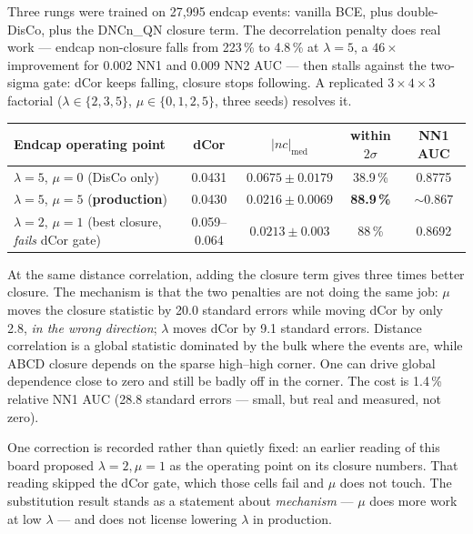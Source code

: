 \documentclass[11pt]{article}
\begin{document}

Three rungs were trained on 27{,}995 endcap events: vanilla BCE, plus
double-DisCo, plus the DNCn\_QN closure term. The decorrelation penalty does real
work --- endcap non-closure falls from 223\,\% to 4.8\,\% at $\lambda=5$, a
$46\times$ improvement for 0.002 NN1 and 0.009 NN2 AUC --- then stalls against
the two-sigma gate: dCor keeps falling, closure stops following. A replicated $3\times4\times3$ factorial ($\lambda\in\{2,3,5\}$,
$\mu\in\{0,1,2,5\}$, three seeds) resolves it.

\begin{center}\boardfont
\begin{tabular}{|l|c|c|c|c|}
\hline
\textbf{Endcap operating point} & \textbf{dCor} & \textbf{$|nc|_{\mathrm{med}}$} & \textbf{within $2\sigma$} & \textbf{NN1 AUC} \\ \hline
$\lambda=5$, $\mu=0$ (DisCo only) & 0.0431 & $0.0675\pm0.0179$ & 38.9\,\% & 0.8775 \\ \hline
$\lambda=5$, $\mu=5$ (\textbf{production}) & 0.0430 & $\mathbf{0.0216\pm0.0069}$ & \textbf{88.9\,\%} & $\sim$0.867 \\ \hline
$\lambda=2$, $\mu=1$ (best closure, \emph{fails} dCor gate) & 0.059--0.064 & $0.0213\pm0.003$ & 88\,\% & 0.8692 \\ \hline
\end{tabular}
\end{center}

At the same distance correlation, adding the closure term gives three times
better closure. The mechanism is that the two penalties are not doing the same
job: $\mu$ moves the closure statistic by 20.0 standard errors while moving
dCor by only 2.8, \emph{in the wrong direction}; $\lambda$ moves dCor by 9.1
standard errors. Distance correlation is a global statistic dominated by the
bulk where the events are, while ABCD closure depends on the sparse
high--high corner. One can drive global dependence close to zero and still be
badly off in the corner. The cost is 1.4\,\% relative NN1 AUC (28.8 standard
errors --- small, but real and measured, not zero).

One correction is recorded rather than quietly fixed: an earlier reading of this
board proposed $\lambda=2,\mu=1$ as the operating point on its closure numbers.
That reading skipped the dCor gate, which those cells fail and $\mu$ does not
touch. The substitution result stands as a
statement about \emph{mechanism} --- $\mu$ does more work at low $\lambda$ ---
and does not license lowering $\lambda$ in production.
\end{document}
